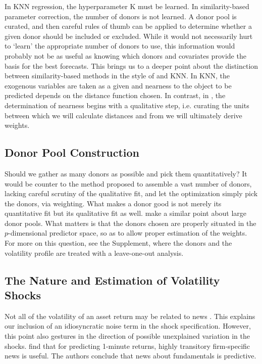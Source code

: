 \documentclass[11pt,3p,review,authoryear]{elsarticle}
\theoremstyle{definition}
\begin{document}
In KNN regression, the hyperparameter K must be learned.  In similarity-based parameter correction, the number of donors is not learned.  A donor pool is curated, and then careful rules of thumb can be applied to determine whether a given donor should be included or excluded.  While it would not necessarily hurt to `learn' the appropriate number of donors to use, this information would probably not be as useful as knowing which donors and covariates provide the basis for the best forecasts.  This brings us to a deeper point about the distinction between similarity-based methods in the style of \citet{lin2021minimizing} and KNN.  In KNN, the exogenous variables are taken as a given and nearness to the object to be predicted depends on the distance function chosen.  In contrast, in \citet{lin2021minimizing}, the determination of nearness begins with a qualitative step, i.e. curating the units between which we will calculate distances and from we will ultimately derive weights.

\subsection{Donor Pool Construction}

Should we gather as many donors as possible and pick them quantitatively?  It would be counter to the method proposed to assemble a vast number of donors, lacking careful scrutiny of the qualitative fit, and let the optimization simply pick the donors, via weighting.  What makes a donor good is not merely its quantitative fit but its qualitative fit as well.  \citet{abadie2022synthetic} make a similar point about large donor pools.  What matters is that the donors chosen are properly situated in the $p$-dimensional predictor space, so as to allow proper estimation of the weights.  For more on this question, see the Supplement, where the donors and the volatility profile are treated with a leave-one-out analysis.

\subsection{The Nature and Estimation of Volatility Shocks}

Not all of the volatility of an asset return may be related to news \citep{boudoukh2019information}.  This explains our inclusion of an idiosyncratic noise term in the shock specification.  However, this point also gestures in the direction of possible unexplained variation in the shocks.  \citet{chinco2019sparse} find that for predicting 1-minute returns, highly transitory firm-specific news is useful.  The authors conclude that news about fundamentals is predictive.
\end{document}

